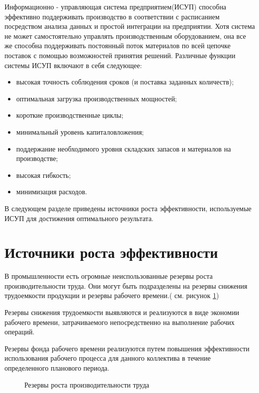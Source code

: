 Информационно - управляющая система предприятием(ИСУП) способна эффективно поддерживать производство в соответствии с расписанием посредством анализа данных и простой интеграции на предприятии. Хотя система не может самостоятельно управлять производственным оборудованием, она все же способна поддерживать постоянный поток материалов по всей цепочке поставок с помощью возможностей принятия решений. Различные функции системы ИСУП включают в себя следующее:

\begin{itemize}
    \item высокая точность соблюдения сроков (и поставка заданных количеств);
    \item оптимальная загрузка производственных мощностей;
    \item короткие производственные циклы;
    \item минимальный уровень капиталовложения;
    \item поддержание необходимого уровня складских запасов и материалов на производстве;
    \item высокая гибкость;
    \item минимизация расходов.
\end{itemize}

В следующем разделе приведены источники роста эффективности, используемые ИСУП для достижения оптимального результата. 

\section{Источники роста эффективности}

В промышленности есть огромные неиспользованные резервы роста производительности труда. Они могут быть подразделены на резервы снижения трудоемкости продукции и резервы рабочего времени.( см. рисунок \ref{ris:reserve1})

Резервы снижения трудоемкости выявляются и реализуются в виде экономии рабочего времени, затрачиваемого непосредственно на выполнение рабочих операций.

Резервы фонда рабочего времени реализуются путем повышения эффективности использования рабочего процесса для данного коллектива в течение определенного планового периода\cite{Lenin}. 


\begin{figure}[H]
    \caption{Резервы роста производительности труда}
    \label{ris:reserve1}
\end{figure}

